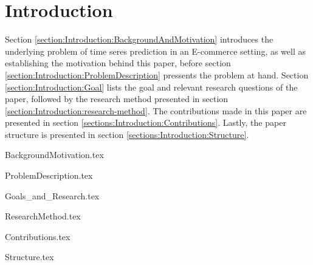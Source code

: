 \chapter{Introduction}
\label{cha:Introduction}

Section \ref{section:Introduction:BackgroundAndMotivation}
introduces the underlying problem of time seres prediction in an E-commerce setting,
as well as establishing the motivation behind this paper,
before section \ref{section:Introduction:ProblemDescription}
pressents the problem at hand.
Section \ref{section:Introduction:Goal} lists the goal and relevant research questions of the paper,
followed by the research method presented in section \ref{section:Introduction:research-method}.
The contributions made in this paper are presented in section \ref{sections:Introduction:Contributions}.
Lastly, the paper structure is presented in section \ref{sections:Introduction:Structure}.


\iffalse
  All chapters should begin with an introduction before any sections begin. Further, each sections begins with an introduction before  subsections begin. Chapters with just one section or sections with just one sub-section, should be avoided. Think carefully about chapter and section titles as each title stand alone in the table of contents (without associated text) and should convey meaning for the contents of the chapter or section.

  In all chapters and sections it is important to write clearly and concisely. Avoid repetitions and if needed, refer back to the original discussion or presentation. Each new section, subsection or paragraph should provide the reader with new information and be written in your own words. Avoid direct quotes. If you use direct quotes, unless the quote itself is very significant, you are conveying to the reader that you are unable to express this discussion or fact yourself. Such direct quotes also break the flow of the language (yours to someone else's).
\fi


{BackgroundMotivation.tex}

{ProblemDescription.tex}

{Goals_and_Research.tex}

{ResearchMethod.tex}

{Contributions.tex}

{Structure.tex}
